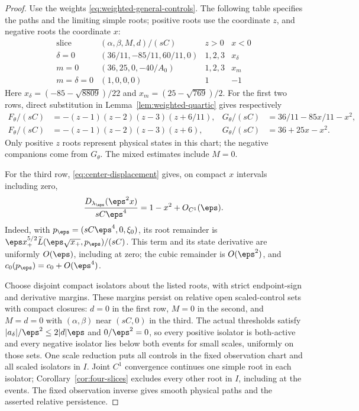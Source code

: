 \begin{proof}
Use the weights \eqref{eq:weighted-general-controls}. The following table
specifies the paths and the limiting simple roots; positive roots use the
coordinate $z$, and negative roots the coordinate $x$:
\begin{equation}\label{eq:sharp-slice-controls}
 \begin{array}{c|c|c|c}
 \text{slice}&(\alpha,\beta,M,d)/(sC)&z>0&x<0\\ \hline
 \delta=0&(36/11,-85/11,60/11,0)&1,2,3&x_\delta\\
 m=0&(36,25,0,-40/A_0)&1,2,3&x_m\\
 m=\delta=0&(1,0,0,0)&1&-1
 \end{array}
\end{equation}
Here $x_\delta=(-85-\sqrt{8809})/22$ and
$x_m=(25-\sqrt{769})/2$. For the first two rows, direct substitution in
Lemma~\ref{lem:weighted-quartic} gives respectively
\[
 \begin{aligned}
 F_\theta/(sC)&=-(z-1)(z-2)(z-3)(z+6/11),&
 G_\theta/(sC)&=36/11-85x/11-x^2,\\
 F_\theta/(sC)&=-(z-1)(z-2)(z-3)(z+6),&
 G_\theta/(sC)&=36+25x-x^2.
 \end{aligned}
\]
Only positive $z$ roots represent physical states in this chart; the
negative companions come from $G_\theta$. The mixed estimates include
$M=0$.

For the third row, \eqref{eq:center-displacement} gives, on compact
$x$ intervals including zero,
\[
 \frac{D_{\lambda_\eps}(\eps^2x)}{sC\eps^4}
 =1-x^2+O_{C^1}(\eps).
\]
Indeed, with $p_\eps=(sC\eps^4,0,\xi_0)$, its root remainder is
$\eps x_+^{5/2}\widetilde L(\eps\sqrt{x_+},p_\eps)/(sC)$.
This term and its state derivative are uniformly $O(\eps)$, including
at zero; the cubic remainder is $O(\eps^2)$, and
$c_0(p_\eps)=c_0+O(\eps^4)$.

Choose disjoint compact isolators about the listed roots, with strict
endpoint-sign and derivative margins. These margins persist on relative
open scaled-control sets with compact closures: $d=0$ in the first row,
$M=0$ in the second, and $M=d=0$ with $(\alpha,\beta)$ near $(sC,0)$
in the third. The actual thresholds satisfy
$|a_\delta|/\eps^2\le2|d|\eps$ and $0/\eps^2=0$, so every positive
isolator is both-active and every negative isolator lies below both events
for small scales, uniformly on those sets. One scale reduction puts all
controls in the fixed observation chart and all scaled isolators in $I$.
Joint $C^1$ convergence continues one simple root in each isolator;
Corollary~\ref{cor:four-slices} excludes every other root in $I$, including
at the events. The fixed observation inverse gives smooth physical paths
and the asserted relative persistence.
\end{proof}
